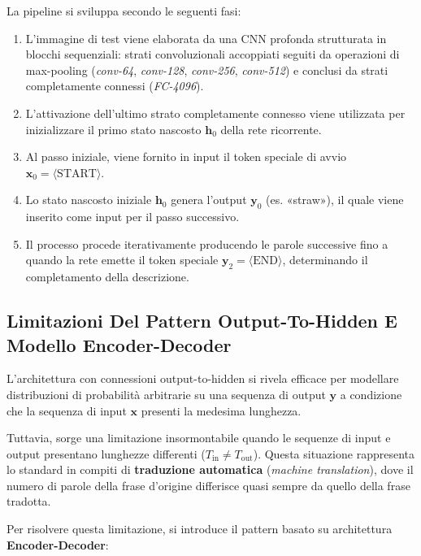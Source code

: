 ﻿\documentclass[11pt, a4paper]{article}
\begin{document}
La pipeline si sviluppa secondo le seguenti fasi:
\begin{enumerate}
    \item L'immagine di test viene elaborata da una CNN profonda strutturata in blocchi sequenziali: strati convoluzionali accoppiati seguiti da operazioni di max-pooling (\emph{conv-64}, \emph{conv-128}, \emph{conv-256}, \emph{conv-512}) e conclusi da strati completamente connessi (\emph{FC-4096}).
    \item L'attivazione dell'ultimo strato completamente connesso viene utilizzata per inizializzare il primo stato nascosto $\bm{h}_0$ della rete ricorrente.
    \item Al passo iniziale, viene fornito in input il token speciale di avvio $\bm{x}_0 = \langle\text{START}\rangle$.
    \item Lo stato nascosto iniziale $\bm{h}_0$ genera l'output $\bm{y}_0$ (es. «straw»), il quale viene inserito come input per il passo successivo.
    \item Il processo procede iterativamente producendo le parole successive fino a quando la rete emette il token speciale $\bm{y}_2 = \langle\text{END}\rangle$, determinando il completamento della descrizione.
\end{enumerate}

\subsection{Limitazioni Del Pattern Output-To-Hidden E Modello Encoder-Decoder}

L'architettura con connessioni output-to-hidden si rivela efficace per modellare distribuzioni di probabilità arbitrarie su una sequenza di output $\bm{y}$ a condizione che la sequenza di input $\bm{x}$ presenti la medesima lunghezza.


Tuttavia, sorge una limitazione insormontabile quando le sequenze di input e output presentano lunghezze differenti ($T_{\text{in}} \neq T_{\text{out}}$). Questa situazione rappresenta lo standard in compiti di \textbf{traduzione automatica} (\emph{machine translation}), dove il numero di parole della frase d'origine differisce quasi sempre da quello della frase tradotta.

Per risolvere questa limitazione, si introduce il pattern basato su architettura \textbf{Encoder-Decoder}:
\end{document}
